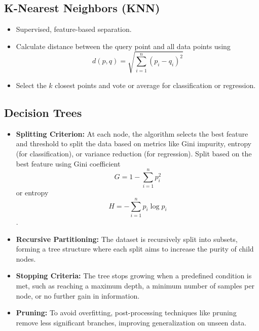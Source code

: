\documentclass[12pt,a4paper]{article}
\begin{document}
\subsection{K-Nearest Neighbors (KNN)}
\begin{itemize}
    \item Supervised, feature-based separation.
    \item Calculate distance between the query point and all data points using \[ d(p, q) = \sqrt{\sum_{i=1}^n (p_i - q_i)^2} \]
    \item Select the $k$ closest points and vote or average for classification or regression.
\end{itemize}

\subsection{Decision Trees}
\begin{itemize}
    \item \textbf{Splitting Criterion:} At each node, the algorithm selects the best feature and threshold to split the data based on metrics like Gini impurity, entropy (for classification), or variance reduction (for regression).
    Split based on the best feature using Gini coefficient \[ G = 1 - \sum_{i=1}^n p_i^2 \] or entropy \[ H = -\sum_{i=1}^n p_i \log p_i \].
    \item \textbf{Recursive Partitioning:} The dataset is recursively split into subsets, forming a tree structure where each split aims to increase the purity of child nodes.
    
    \item \textbf{Stopping Criteria:} The tree stops growing when a predefined condition is met, such as reaching a maximum depth, a minimum number of samples per node, or no further gain in information.
    
    \item \textbf{Pruning:} To avoid overfitting, post-processing techniques like pruning remove less significant branches, improving generalization on unseen data.
\end{itemize}
\end{document}
